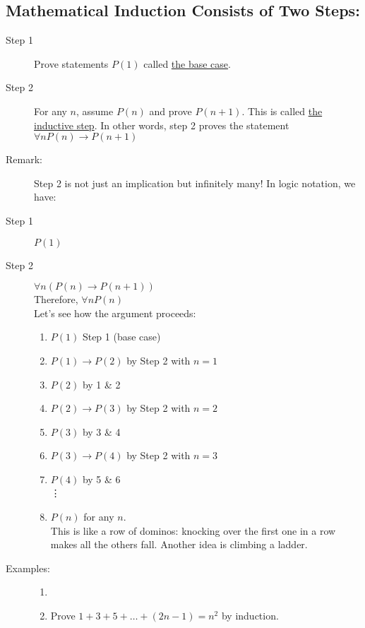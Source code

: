 \documentclass[10pt]{article}
\begin{document}
	\subsection{Mathematical Induction Consists of Two Steps:}
	\begin{description}
		\item[Step 1] Prove statements $P(1)$ called \underline{the base case}.
		\item[Step 2] For any $n$, assume $P(n)$ and prove $P(n+1)$. This is called \underline{the inductive step}. In other words, step 2 proves the statement $\forall n P(n) \rightarrow P(n+1)$
		\item[Remark:] Step 2 is not just an implication but infinitely many! In logic notation, we have:
		\item[Step 1] $P(1)$
		\item[Step 2] $\forall n (P(n) \rightarrow P(n+1))$ \\
		Therefore, $\forall n P(n)$ \\
		Let's see how the argument proceeds:
		\begin{enumerate}
			\item $P(1)$ \hspace{10mm} Step 1 (base case)
			\item $P(1) \rightarrow P(2)$ \hspace{10mm} by Step 2 with $n=1$
			\item $P(2)$ \hspace{10mm} by 1 \& 2
			\item $P(2) \rightarrow P(3)$ \hspace{10mm} by Step 2 with $n=2$
			\item $P(3)$ \hspace{10mm} by 3 \& 4
			\item $P(3) \rightarrow P(4)$ \hspace{10mm} by Step 2 with $n=3$
			\item $P(4)$ \hspace{10mm} by 5 \& 6 \\
			\vdots
			\item $P(n)$ for any $n$. \\
			This is like a row of dominos: knocking over the first one in a row makes all the others fall. Another idea is climbing a ladder.
		\end{enumerate}
		\item[Examples:]
		\begin{enumerate}
			\item[]
			\item Prove $1+3+5+\dots+(2n-1) = n^2$ by induction.

\end{enumerate}
\end{description}
\end{document}
